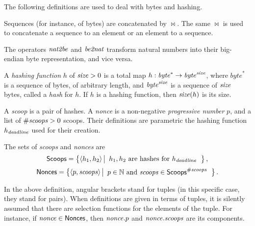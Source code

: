 The following definitions are used to deal with bytes and hashing.
%
\begin{definition}
  Sequences (for instance, of bytes) are concatenated by $\bowtie$. The same $\bowtie$
  is used to concatenate a sequence to an element or an element to a sequence.
\end{definition}
%
\begin{definition}
  The operators ${\mathit{nat2be}}$ and ${\mathit{be2nat}}$ transform natural numbers
  into their big-endian byte representation, and vice versa.
\end{definition}
%
\begin{definition}
  A \emph{hashing function} $h$ of ${\mathit{size}}>0$
  is a total map $h:\mathit{byte}^*\to\mathit{byte}^{\mathit{size}}$, where
  $\mathit{byte}^*$ is a sequence of bytes, of arbitrary length,
  and $\mathit{byte}^{\mathit{size}}$ is a sequence of ${\mathit{size}}$ bytes, called a \emph{hash} for $h$.
  If $h$ is a hashing function, then ${\mathit{size}}(h)$ is its size.
\end{definition}

A \emph{scoop} is a pair of hashes.
A \emph{nonce} is a non-negative \emph{progressive number} $p$, and
a list of ${\#\mathit{scoops}}>0$ scoops.
Their definitions are parametric \wrt the hashing function $h_{\mathit{deadline}}$ used for their creation.
%
\begin{definition}
  The sets of \emph{scoops} and \emph{nonces} are
  \[
  {\mathsf{Scoops}}=\left\{\langle h_1,h_2\rangle\left|\begin{array}{l}
  h_1,h_2\text{ are hashes for }h_{\mathit{deadline}}
  \end{array}\right.\right\},
  \]
  \[
  {\mathsf{Nonces}}=\left\{\langle p,{\mathit{scoops}}\rangle\left|\begin{array}{l}
  p\in\mathbb{N}\text{ and }{\mathit{scoops}}\in{\mathsf{Scoops}}^{\#\mathit{scoops}}
  \end{array}\right.\right\}.
  \]
\end{definition}
%
In the above definition, angular brackets stand for tuples (in this specific
case, they stand for pairs). When definitions are given in terms of tuples,
it is silently assumed that there are selection functions
for the elements of the tuple. For instance, if ${\mathit{nonce}}\in{\mathsf{Nonces}}$, then ${\mathit{nonce}}.p$
and ${\mathit{nonce}}.{\mathit{scoops}}$ are its components.

